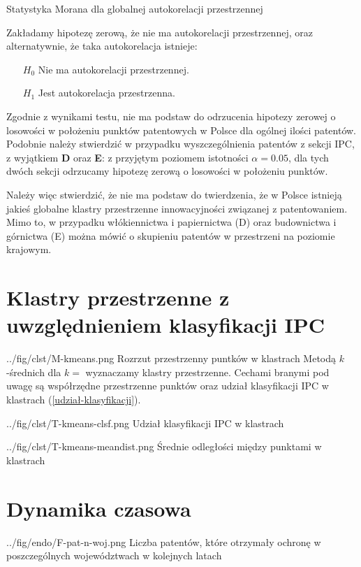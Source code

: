 { Statystyka Morana dla globalnej 
  autokorelacji przestrzennej }
{
  Zakładamy hipotezę zerową, że nie ma autokorelacji przestrzennej, oraz
alternatywnie, że taka autokorelacja istnieje:
\begin{itemize}
\item[$H_0$] Nie ma autokorelacji przestrzennej.
\item[$H_1$] Jest autokorelacja przestrzenna.
\end{itemize}}

Zgodnie z wynikami testu, nie ma podstaw do odrzucenia hipotezy zerowej
o losowości w położeniu punktów patentowych w Polsce dla ogólnej ilości patentów.
Podobnie należy stwierdzić w przypadku wyszczególnienia patentów z sekcji \ac{IPC},
z wyjątkiem \textbf{D} oraz \textbf{E}: z przyjętym poziomem istotności $\alpha=0.05$,
dla tych dwóch sekcji odrzucamy hipotezę zerową o losowości w położeniu punktów.

Należy więc stwierdzić, że nie ma podstaw do twierdzenia, że w Polsce istnieją
jakieś globalne klastry przestrzenne innowacyjności związanej z patentowaniem.
Mimo to, w przypadku włókiennictwa i papiernictwa (D) oraz 
budownictwa i górnictwa (E) można mówić o skupieniu patentów w przestrzeni
na poziomie krajowym.




    \newpage\section
  {Klastry przestrzenne z uwzględnieniem klasyfikacji \ac{IPC}}

  \figside
{../fig/clst/M-kmeans.png}
{Rozrzut przestrzenny puntków w klastrach}
{
Metodą $k$-średnich dla $k=$ wyznaczamy klastry przestrzenne. 
Cechami branymi pod uwagę są współrzędne przestrzenne punktów oraz
udział klasyfikacji \ac{IPC} w klastrach (\cref{udział-klasyfikacji}).
}

\tblside
{../fig/clst/T-kmeans-clsf.png}
{Udział klasyfikacji \ac{IPC} w klastrach}

\tblside
{../fig/clst/T-kmeans-meandist.png}
{Średnie odległości między punktami w klastrach}




    \newpage\section{Dynamika czasowa}

  \figside
{../fig/endo/F-pat-n-woj.png}
{ Liczba patentów, które otrzymały ochronę w poszczególnych województwach 
  w kolejnych latach }

